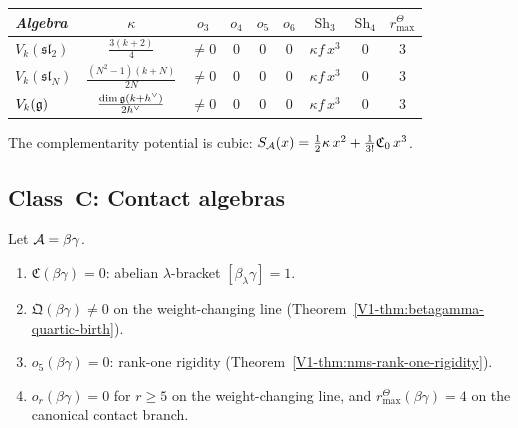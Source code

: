 \begin{example}
\begin{center}
\small
\renewcommand{\arraystretch}{1.15}
\begin{tabular}{lcccccccc}
\toprule
\emph{Algebra} & $\kappa$ & $o_3$ & $o_4$ & $o_5$ &
 $o_6$ & $\mathrm{Sh}_3$ & $\mathrm{Sh}_4$ & \(r^\Theta_{\max}\) \\
\midrule
$V_k(\mathfrak{sl}_2)$ &
 $\frac{3(k+2)}{4}$ & $\neq 0$ & $0$ & $0$ & $0$ &
 $\kappa f\,x^3$ & $0$ & $3$ \\
$V_k(\mathfrak{sl}_N)$ &
 $\frac{(N^2{-}1)(k+N)}{2N}$ & $\neq 0$ & $0$ & $0$ & $0$ &
 $\kappa f\,x^3$ & $0$ & $3$ \\
$V_k(\mathfrak{g})$ &
 $\frac{\dim\mathfrak{g}(k+h^\vee)}{2h^\vee}$ & $\neq 0$ & $0$ & $0$ & $0$ &
 $\kappa f\,x^3$ & $0$ & $3$ \\
\bottomrule
\end{tabular}
\end{center}
The complementarity potential is cubic:
$S_{\mathcal{A}}(x) = \frac{1}{2}\kappa\,x^2 + \frac{1}{3!}
\mathfrak{C}_0\,x^3$.
\end{example}



\subsection{Class~$\mathbf{C}$: Contact algebras}

\begin{theorem}
\ClaimStatusProvedElsewhere
{}
Let $\mathcal{A} = \beta\gamma$.
\begin{enumerate}[label=\textup{(\roman*)}]
\item $\mathfrak{C}(\beta\gamma) = 0$: abelian
 $\lambda$-bracket $[\beta_\lambda\gamma] = 1$.
\item $\mathfrak{Q}(\beta\gamma) \neq 0$ on the
 weight-changing line
 \textup{(}Theorem~\ref{V1-thm:betagamma-quartic-birth}\textup{)}.
\item $o_5(\beta\gamma) = 0$: rank-one rigidity
 \textup{(}Theorem~\ref{V1-thm:nms-rank-one-rigidity}\textup{)}.
\item \(o_r(\beta\gamma)=0\) for \(r\ge5\) on the
 weight-changing line, and \(r^\Theta_{\max}(\beta\gamma)=4\)
 on the canonical contact branch.
\end{enumerate}
\end{theorem}

